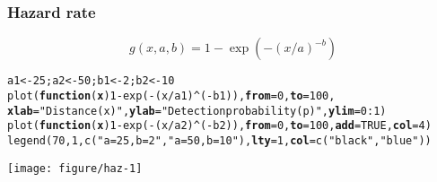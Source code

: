 \documentclass[color=usenames,dvipsnames]{beamer}\usepackage[]{graphicx}\usepackage[]{xcolor}
\makeatletter
\newcommand{\hlnum}[1]{\textcolor[rgb]{0.69,0.494,0}{#1}}%
\newcommand{\hlsng}[1]{\textcolor[rgb]{0.749,0.012,0.012}{#1}}%
\newcommand{\hlopt}[1]{\textcolor[rgb]{0,0,0}{#1}}%
\newcommand{\hldef}[1]{\textcolor[rgb]{0,0,0}{#1}}%
\newcommand{\hlkwa}[1]{\textcolor[rgb]{0,0,0}{\textbf{#1}}}%
\newcommand{\hlkwb}[1]{\textcolor[rgb]{0,0.341,0.682}{#1}}%
\newcommand{\hlkwc}[1]{\textcolor[rgb]{0,0,0}{\textbf{#1}}}%
\newcommand{\hlkwd}[1]{\textcolor[rgb]{0.004,0.004,0.506}{#1}}%
\newenvironment{kframe}{%
 \def\at@end@of@kframe{}%
 \ifinner\ifhmode%
  \def\at@end@of@kframe{\end{minipage}}%
  \begin{minipage}{\columnwidth}%
 \fi\fi%
 \def\FrameCommand##1{\hskip\@totalleftmargin \hskip-\fboxsep
 \colorbox{shadecolor}{##1}\hskip-\fboxsep
     \hskip-\linewidth \hskip-\@totalleftmargin \hskip\columnwidth}%
 \MakeFramed {\advance\hsize-\width
   \@totalleftmargin\z@ \linewidth\hsize
   \@setminipage}}%
 {\par\unskip\endMakeFramed%
 \at@end@of@kframe}
\newenvironment{knitrout}{}{} %
\makeatother
\begin{document}
\begin{frame}[fragile]
  \frametitle{Hazard rate}
  \footnotesize
  \[
    g(x,a,b) = 1-\exp(-(x/a)^{-b})
  \]
  \vspace{-12pt}
  \centering
\begin{knitrout}\scriptsize
{}\color{fgcolor}\begin{kframe}
\begin{alltt}
\hldef{a1} \hlkwb{<-} \hlnum{25}\hldef{; a2} \hlkwb{<-} \hlnum{50}\hldef{; b1} \hlkwb{<-} \hlnum{2}\hldef{; b2} \hlkwb{<-} \hlnum{10}
\hlkwd{plot}\hldef{(}\hlkwa{function}\hldef{(}\hlkwc{x}\hldef{)} \hlnum{1}\hlopt{-}\hlkwd{exp}\hldef{(}\hlopt{-}\hldef{(x}\hlopt{/}\hldef{a1)}\hlopt{^}\hldef{(}\hlopt{-}\hldef{b1)),} \hlkwc{from}\hldef{=}\hlnum{0}\hldef{,} \hlkwc{to}\hldef{=}\hlnum{100}\hldef{,}
     \hlkwc{xlab}\hldef{=}\hlsng{"Distance (x)"}\hldef{,} \hlkwc{ylab}\hldef{=}\hlsng{"Detection probability (p)"}\hldef{,} \hlkwc{ylim}\hldef{=}\hlnum{0}\hlopt{:}\hlnum{1}\hldef{)}
\hlkwd{plot}\hldef{(}\hlkwa{function}\hldef{(}\hlkwc{x}\hldef{)} \hlnum{1}\hlopt{-}\hlkwd{exp}\hldef{(}\hlopt{-}\hldef{(x}\hlopt{/}\hldef{a2)}\hlopt{^}\hldef{(}\hlopt{-}\hldef{b2)),} \hlkwc{from}\hldef{=}\hlnum{0}\hldef{,} \hlkwc{to}\hldef{=}\hlnum{100}\hldef{,} \hlkwc{add}\hldef{=}\hlnum{TRUE}\hldef{,} \hlkwc{col}\hldef{=}\hlnum{4}\hldef{)}
\hlkwd{legend}\hldef{(}\hlnum{70}\hldef{,} \hlnum{1}\hldef{,} \hlkwd{c}\hldef{(}\hlsng{"a=25, b=2"}\hldef{,} \hlsng{"a=50, b=10"}\hldef{),} \hlkwc{lty}\hldef{=}\hlnum{1}\hldef{,} \hlkwc{col}\hldef{=}\hlkwd{c}\hldef{(}\hlsng{"black"}\hldef{,}\hlsng{"blue"}\hldef{))}
\end{alltt}
\end{kframe}

{\centering \texttt{[image: figure/haz-1]} 

}


\end{knitrout}
\end{frame}
\end{document}
